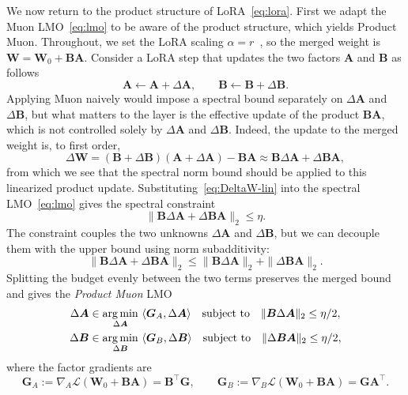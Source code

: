 \documentclass[11pt]{article}
\newcommand{\mat}[1]{\bm{#1}}
\DeclareMathOperator*{\argmin}{arg\,min}
\newcommand{\ip}[1]{\langle #1 \rangle}
\newcommand{\norm}[1]{\| #1\|}
\begin{document}
We now return to the product structure of LoRA~\eqref{eq:lora}. First we adapt the Muon LMO~\eqref{eq:lmo} to be aware of the product structure, which yields Product Muon. 
Throughout, we set the LoRA scaling $\alpha=r$~\cite{loralearnsless, raschka}, so the merged weight is $\mat{W} = \mat{W}_0 + \mat{B}\mat{A}$. Consider a LoRA step that updates the two factors $\mat{A}$ and $\mat{B}$ as follows
\[
\mat{A} \leftarrow \mat{A} + \Delta\mat{A},
\qquad
\mat{B} \leftarrow \mat{B} + \Delta\mat{B}.
\]
Applying Muon naively would impose a spectral bound separately on $\Delta\mat{A}$ and $\Delta\mat{B}$, but what matters to the layer is the effective update of the product $\mat{B}\mat{A}$, which is not controlled solely by $\Delta\mat{A}$ and $\Delta\mat{B}$. Indeed, the update to the merged weight is, to first order,
\begin{equation} \label{eq:DeltaW-lin}
\Delta\mat{W} = (\mat{B} + \Delta\mat{B})(\mat{A} + \Delta\mat{A}) - \mat{B}\mat{A} \approx \mat{B} \Delta\mat{A} + \Delta\mat{B} \mat{A},
\end{equation}
from which we see that the spectral norm bound should be applied to this linearized product update. Substituting~\eqref{eq:DeltaW-lin} into the spectral LMO~\eqref{eq:lmo} gives the spectral constraint
\[
\norm{\mat{B} \Delta\mat{A} + \Delta\mat{B} \mat{A}}_2
\le \eta.
\]
The constraint couples the two unknowns $\Delta\mat{A}$ and $\Delta\mat{B}$, but we can decouple them with the upper bound using norm subadditivity:
\[
\norm{\mat{B} \Delta\mat{A} + \Delta\mat{B} \mat{A}}_2
\le
\norm{\mat{B} \Delta\mat{A}}_2 + \norm{\Delta\mat{B} \mat{A}}_2.
\]
Splitting the budget evenly between the two terms preserves the merged bound and gives the \emph{Product Muon} LMO
\begin{equation}
  \begin{aligned}
  \Delta\mat{A} &\in \argmin_{\Delta\mat{A}}~ \ip{\mat{G}_A, \Delta\mat{A}}
  \quad \textnormal{subject to}\quad
  \norm{\mat{B} \Delta\mat{A}}_2\le\eta/2, \\
  \Delta\mat{B} &\in \argmin_{\Delta\mat{B}}~ \ip{\mat{G}_B, \Delta\mat{B}}
  \quad \textnormal{subject to}\quad
  \norm{\Delta\mat{B} \mat{A}}_2\le\eta/2,
  \end{aligned}
  \label{eq:decoupled-lora-lmo}
\end{equation}
where the factor gradients are
\begin{equation}\label{e-grad-wrt-factors}
    \mat{G}_A := \nabla_A \mathcal{L}(\mat{W}_0+\mat{B}\mat{A}) = \mat{B}^\top \mat{G},
    \qquad
    \mat{G}_B := \nabla_B \mathcal{L}(\mat{W}_0+\mat{B}\mat{A}) = \mat{G} \mat{A}^\top.
\end{equation}
\end{document}
